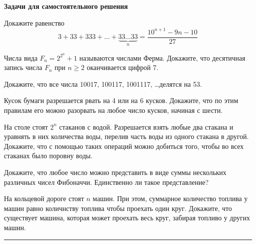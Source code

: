 {\bf Задачи для самостоятельного решения}
\begin{problems}



\item
Докажите равенство $$3 + 33 + 333 + \ldots + \underbrace{33 \ldots
33}_n = \dfrac{10^{n+1} - 9n - 10}{27}$$

\item Числа вида $F_n = 2^{2^n} + 1$ называются числами Ферма. Докажите, что десятичная запись числа $F_n$ при $n \geqslant 2$ оканчивается цифрой 7.

\item Докажите, что все числа 10017, 100117, 1001117, \ldots делятся на 53.
\item Кусок бумаги разрешается рвать на 4 или на 6 кусков. Докажите, что по этим правилам его можно разорвать на любое число кусков, начиная с шести.
\item На столе стоят $2^n$ стаканов с водой. Разрешается взять любые два стакана и уравнять в них количества воды, перелив часть воды из одного стакана в другой. Докажите, что с помощью таких операций можно добиться того, чтобы во всех стаканах было поровну воды. 
\item Докажите, что любое число можно представить в виде суммы нескольких различных чисел Фибоначчи. Единственно ли такое представление?
\item На кольцевой дороге стоят $n$ машин. При этом, суммарное количество топлива у машин  равно количнству топлива чтобы проехать один круг. Докажите, что существует машина, которая может проехать весь круг, забирая топливо у других машин.

\strut\hrule


\end{problems}
